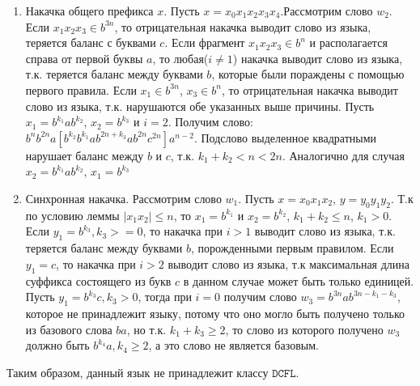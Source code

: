 \documentclass[a4paper, 14pt]{article}
\begin{document}
\begin{enumerate}
  \item{Накачка общего префикса $x$. Пусть $x = x_0 x_1 x_2 x_3 x_4$.Рассмотрим слово $w_2$. Если $x_1 x_2 x_3 \in b^{3n}$, то отрицательная накачка выводит слово из языка, теряется баланс с буквами $c$. Если фрагмент $x_1 x_2 x_3 \in b^{n}$ и располагается справа от первой буквы $a$, то любая($i \ne 1$) накачка выводит слово из языка}, т.к. теряется баланс между буквами $b$, которые были пораждены с помощью первого правила. Если $x_1 \in b^{3n}$, $x_3 \in b^{n}$, то отрицательная накачка выводит слово из языка, т.к. нарушаются обе указанных выше причины. Пусть $x_1 = b^{k_1} a b^{k_2}$, $x_2 = b^{k_3}$ и $i = 2$. Получим слово: $b^{n} b^{2n} a [b^{k_2} b^{k_1} a b^{2n + k_3} a b^{2n} c^{2n}] a^{n-2}$. Подслово выделенное квадратными нарушает баланс между $b$ и $c$, т.к. $k_1 + k_2 < n < 2n$. Аналогично для случая  $x_2 = b^{k_1} a b^{k_2}$, $x_1 = b^{k_3}$ 

  \item{Синхронная накачка. Рассмотрим слово $w_1$. Пусть $x = x_0 x_1 x_2$, $y = y_0 y_1 y_2$. Т.к по условию леммы $|x_1 x_2| \leq n$, то $x_1 = b^{k_1}$ и $x_2 = b^{k_2}$, $k_1 + k_2 \leq n$, $k_1 > 0$}. Если $y_1 = b^{k_3}, k_3 >= 0$, то накачка при $i > 1$ выводит слово из языка, т.к. теряется баланс между буквами $b$, порожденными первым правилом. Если $y_1 = c$, то накачка при $i > 2$ выводит слово из языка, т.к максимальная длина суффикса состоящего из букв $c$ в данном случае может быть только единицей.
    Пусть $y_1 = b^{k_3}c, k_3 > 0$, тогда при $i = 0$ получим слово $w_3 = b^{3n}ab^{3n - k_1 - k_3}$, которое не принадлежит языку, потому что оно могло быть получено только из базового слова $ba$, но т.к. $k_1 + k_3 \geq 2$, то слово из которого получено $w_3$ должно быть $b^{k_4}a, k_4 \geq 2$, а это слово не является базовым. 
\end{enumerate}

Таким образом, данный язык не принадлежит классу $\mathtt{DCFL}$. 


\newpage
\end{document}
